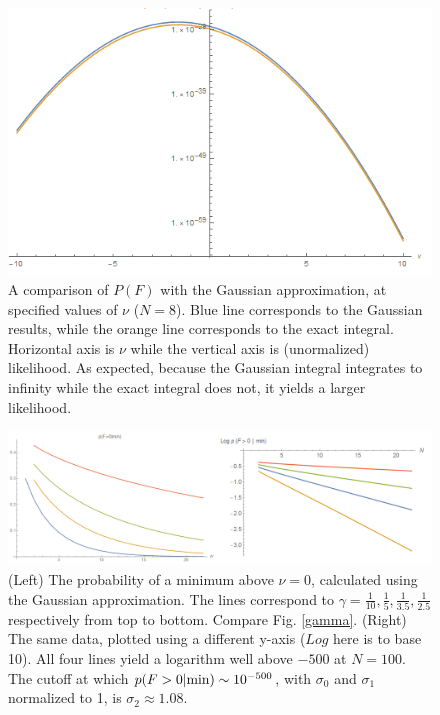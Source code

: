 \documentclass[12pt]{article}
\begin{document}
\begin{figure} 
  \centering
  \includegraphics[width=\linewidth]{Comparison.png}
  \caption{A comparison of $P(F)$ with the Gaussian approximation, at specified values of $\nu$ ($N=8$). Blue line corresponds to the Gaussian results, while the orange line corresponds to the exact integral. Horizontal axis is $\nu$ while the vertical axis is (unormalized) likelihood. As expected, because the Gaussian integral integrates to infinity while the exact integral does not, it yields a larger likelihood.}
  \label{Comparison}
\end{figure}

\begin{figure} 
  \centering
  \includegraphics[width=\linewidth]{PVaryingWithNGaussian.png}
  \caption{(Left) The probability of a minimum above $\nu=0$, calculated using the Gaussian approximation. The lines correspond to $\gamma = \frac{1}{10}, \frac{1}{5}, \frac{1}{3.5}, \frac{1}{2.5}$ respectively from top to bottom. Compare Fig. \ref{gamma}. (Right) The same data, plotted using a different y-axis ($Log$ here is to base 10). All four lines yield a logarithm well above $-500$ at $N=100$. The cutoff at which $p(F>0|{\rm min}) \sim 10^{-500}$, with $\sigma_0$ and $\sigma_1$ normalized to 1,  is $\sigma_2 \approx 1.08$.}
  \label{PVaryingWithNGaussian}
\end{figure}
\end{document}
